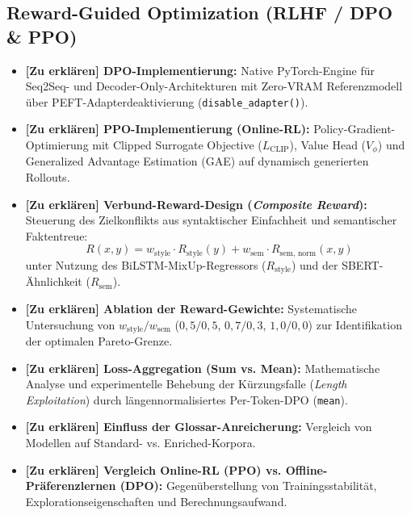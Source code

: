 \subsection{Reward-Guided Optimization (RLHF / DPO \& PPO)}
\label{sec:dpo_optimization}
\begin{tcolorbox}[colback=red!5!white,colframe=red!75!black,title=\textbf{Zu erklären in diesem Abschnitt:},sharp corners,boxrule=0.8pt]
\color{red!80!black}
\begin{itemize}
    \item \textbf{[Zu erklären] DPO-Implementierung:} Native PyTorch-Engine für Seq2Seq- und Decoder-Only-Architekturen mit Zero-VRAM Referenzmodell über PEFT-Adapterdeaktivierung (\texttt{disable\_adapter()}).
    \item \textbf{[Zu erklären] PPO-Implementierung (Online-RL):} Policy-Gradient-Optimierung mit Clipped Surrogate Objective ($L_{\text{CLIP}}$), Value Head ($V_\phi$) und Generalized Advantage Estimation (GAE) auf dynamisch generierten Rollouts.
    \item \textbf{[Zu erklären] Verbund-Reward-Design (\textit{Composite Reward}):} Steuerung des Zielkonflikts aus syntaktischer Einfachheit und semantischer Faktentreue:
    \begin{equation}
        R(x, y) = w_{\text{style}} \cdot R_{\text{style}}(y) + w_{\text{sem}} \cdot R_{\text{sem, norm}}(x, y)
    \end{equation}
    unter Nutzung des BiLSTM-MixUp-Regressors ($R_{\text{style}}$) und der SBERT-Ähnlichkeit ($R_{\text{sem}}$).
    \item \textbf{[Zu erklären] Ablation der Reward-Gewichte:} Systematische Untersuchung von $w_{\text{style}} / w_{\text{sem}}$ ($0{,}5/0{,}5$, $0{,}7/0{,}3$, $1{,}0/0{,}0$) zur Identifikation der optimalen Pareto-Grenze.
    \item \textbf{[Zu erklären] Loss-Aggregation (Sum vs. Mean):} Mathematische Analyse und experimentelle Behebung der Kürzungsfalle (\textit{Length Exploitation}) durch längennormalisiertes Per-Token-DPO (\texttt{mean}).
    \item \textbf{[Zu erklären] Einfluss der Glossar-Anreicherung:} Vergleich von Modellen auf Standard- vs. Enriched-Korpora.
    \item \textbf{[Zu erklären] Vergleich Online-RL (PPO) vs. Offline-Präferenzlernen (DPO):} Gegenüberstellung von Trainingsstabilität, Explorationseigenschaften und Berechnungsaufwand.
\end{itemize}
\end{tcolorbox}

